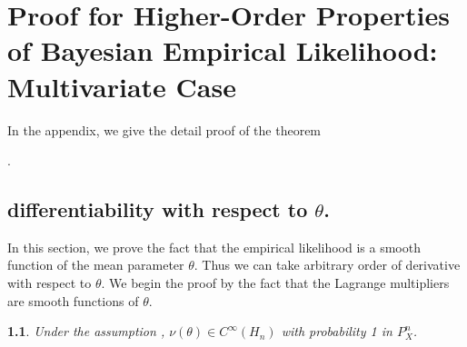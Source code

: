 \documentclass[oneside,english]{amsbook}
\numberwithin{section}{chapter}
\numberwithin{equation}{section}
\numberwithin{figure}{section}
\theoremstyle{plain}
\newtheorem{lem}{\protect\lemmaname}
\theoremstyle{plain}
\theoremstyle{definition}
\theoremstyle{plain}
\theoremstyle{plain}
\theoremstyle{remark}
\theoremstyle{definition}
\theoremstyle{definition}
\providecommand{\lemmaname}{Lemma}
\begin{document}
\chapter{Proof for Higher-Order Properties of Bayesian Empirical Likelihood:
Multivariate Case}

In the appendix, we give the detail proof of the theorem %

. 


\section{differentiability with respect to $\theta$. }

In this section, we prove the fact that the empirical likelihood is
a smooth function of the mean parameter $\theta$. Thus we can take
arbitrary order of derivative with respect to $\theta$. We begin
the proof by the fact that the Lagrange multipliers are smooth functions
of $\theta$. 
\begin{lem}
\label{lem:mul-el-smooth-lagrange-multp}Under the assumption ,
$\nu\left(\theta\right)\in C^{\infty}\left(H_{n}\right)$ with probability
1 in $P_{X}^{n}$. \end{lem}
\end{document}
